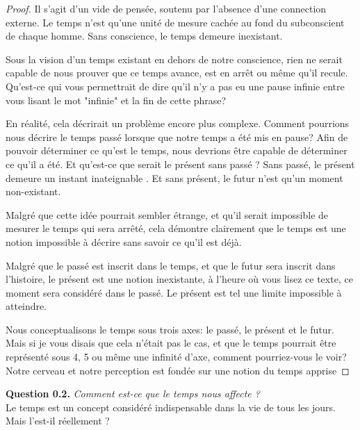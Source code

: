 \documentclass{Tools}
\begin{document}
\begin{proof}
Il s'agit d'un vide de pensée, soutenu par l'absence d'une connection externe. Le temps n'est qu'une unité de mesure cachée au fond du subconscient de chaque homme.
Sans conscience, le temps demeure inexistant.

Sous la vision d'un temps existant en dehors de notre conscience, rien ne serait capable de nous prouver que ce temps avance, est en arrêt ou même qu'il recule.
Qu'est-ce qui vous permettrait de dire qu'il n'y a pas eu une pause infinie entre vous lisant le mot "infinie" et la fin de cette phrase? 

En réalité, cela décrirait un problème encore plus complexe. Comment pourrions nous décrire le temps passé lorsque que notre temps a été mis en pause? Afin de pouvoir déterminer ce qu'est le temps, nous devrions être capable de déterminer ce qu'il a été. Et qu'est-ce que serait le présent sans passé ? Sans passé, le présent demeure un instant inateignable . Et sans présent, le futur n'est qu'un moment non-existant.

Malgré que cette idée pourrait sembler étrange, et qu'il serait impossible de mesurer le temps qui sera arrêté, cela démontre clairement que le temps est une notion impossible à décrire sans savoir ce qu'il est déjà.

Malgré que le passé est inscrit dans le temps, et que le futur sera inscrit dans l'histoire, le présent est une notion inexistante, à l'heure où vous lisez ce texte, ce moment sera considéré dans le passé. Le présent est tel une limite impossible à atteindre.

Nous conceptualisons le temps sous trois axes: le passé, le présent et le futur. Mais si je vous disais que cela n'était pas le cas, et que le temps pourrait être représenté sous 4, 5 ou même une infinité d'axe, comment pourriez-vous le voir? Notre cerveau et notre perception est fondée sur une notion du temps apprise

\end{proof} 

\textbf{Question 0.2.} \emph{Comment est-ce que le temps nous affecte ?}\\ 
Le temps est un concept considéré indispensable dans la vie de tous les jours. Mais l'est-il réellement ?


\end{document}
